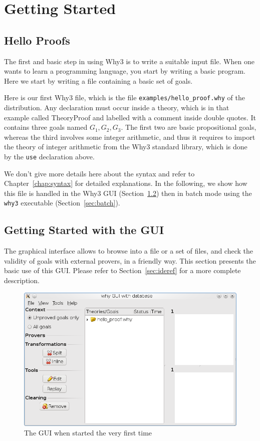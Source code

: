 \chapter{Getting Started}
\label{chap:starting}

\section{Hello Proofs}

The first and basic step in using Why3 is to write a suitable input
file. When one wants to learn a programming language, you start by
writing a basic program. Here we start by writing a file containing a
basic set of goals. 

Here is our first Why3 file, which is the file
\texttt{examples/hello\_proof.why} of the distribution.
 Any declaration must occur
inside a theory, which is in that example called TheoryProof and
labelled with a comment inside double quotes. It contains three goals
named $G_1,G_2,G_3$. The first two are basic propositional goals,
whereas the third involves some integer arithmetic, and thus it
requires to import the theory of integer arithmetic from the Why3
standard library, which is done by the \texttt{use} declaration above.

We don't give more details here about the syntax and refer to
Chapter~\ref{chap:syntax} for detailed explanations. In the following,
we show how this file is handled in the Why3 GUI
(Section~\ref{sec:gui}) then in batch mode using the \texttt{why3}
executable (Section~\ref{sec:batch}). 


\section{Getting Started with the GUI}
\label{sec:gui}

The graphical interface allows to browse into a file or a set of
files, and check the validity of goals with external provers, in a
friendly way. This section presents the basic use of this GUI. Please
refer to Section~\ref{sec:ideref} for a more complete description.

\begin{figure}[tbp]
  \includegraphics[width=\textwidth]{gui1.png}
  \caption{The GUI when started the very first time}
  \label{fig:gui1}
\end{figure}


